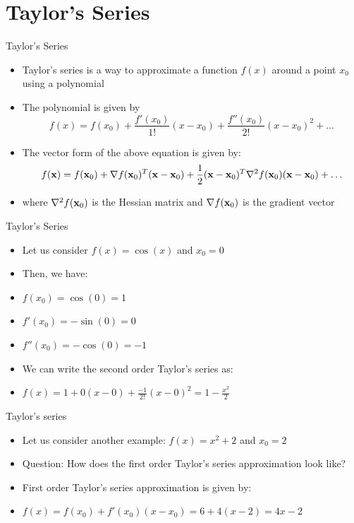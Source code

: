 \documentclass[usenames,dvipsnames]{beamer}
\begin{document}
  
\section{Taylor's Series}
\begin{frame}{Taylor's Series}
    \begin{itemize}[<+->]
        \item Taylor's series is a way to approximate a function $f(x)$ around a point $x_0$ using a polynomial
        \item The polynomial is given by
        \begin{equation}
            f(x) = f(x_0) + \frac{f'(x_0)}{1!}(x-x_0) + \frac{f''(x_0)}{2!}(x-x_0)^2 + \ldots
        \end{equation}
        \item The vector form of the above equation is given by:
        \begin{equation}
            f(\mathbf{x}) = f(\mathbf{x}_0) + \nabla f(\mathbf{x}_0)^T(\mathbf{x}-\mathbf{x}_0) + \frac{1}{2}(\mathbf{x}-\mathbf{x}_0)^T\nabla^2 f(\mathbf{x}_0)(\mathbf{x}-\mathbf{x}_0) + \ldots
        \end{equation}
        \item where $\nabla^2 f(\mathbf{x}_0)$ is the Hessian matrix and $\nabla f(\mathbf{x}_0)$ is the gradient vector
    \end{itemize}
\end{frame}

    \begin{frame}{Taylor's Series}
        \begin{itemize}[<+->]
            \item Let us consider $f(x) = \cos(x)$ and $x_0 = 0$
            \item Then, we have:
            \item $f(x_0) = \cos(0) = 1$
            \item $f'(x_0) = -\sin(0) = 0$
            \item $f''(x_0) = -\cos(0) = -1$
            \item We can write the second order Taylor's series as:
            \item $f(x) = 1 + 0(x-0) + \frac{-1}{2!}(x-0)^2 = 1 - \frac{x^2}{2}$
        \end{itemize}
        
    \end{frame}

    
    \begin{frame}{Taylor's series}
        \begin{itemize}[<+->]
            \item Let us consider another example: $f(x) = x^2 + 2$ and $x_0 = 2$
            \item Question: How does the first order Taylor's series approximation look like?
            \item First order Taylor's series approximation is given by:
            \item $f(x) = f(x_0) + f'(x_0)(x-x_0) = 6 + 4(x-2) = 4x - 2$
        \end{itemize}
        
    \end{frame}
\end{document}
